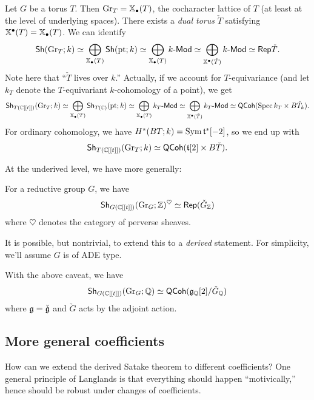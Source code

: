 \documentclass{article}
\begin{document}
\begin{ex}
	Let $G$ be a torus $T$.
	Then $\operatorname{Gr}_T = \mathbb{X}_\bullet(T)$, the cocharacter lattice of $T$ (at least at the level of underlying spaces).
	There exists a \emph{dual torus} $\check{T}$ satisfying $\mathbb{X}^\bullet(T) = \mathbb{X}_\bullet(T)$.
	We can identify
	\[
		\mathsf{Sh}(\operatorname{Gr}_T; k) \simeq \bigoplus_{\mathbb{X}_\bullet(T)} \mathsf{Sh}(\operatorname{pt}; k) \simeq \bigoplus_{\mathbb{X}_\bullet(T)} k\text{-}\mathsf{Mod} \simeq \bigoplus_{\mathbb{X}^\bullet(\check{T})} k\text{-}\mathsf{Mod} \simeq \mathsf{Rep} \check{T}.
	\]
	Note here that ``$\check{T}$ lives over $k$.''
	Actually, if we account for $T$-equivariance (and let $k_T$ denote the $T$-equivariant $k$-cohomology of a point), we get
	\[
		\mathsf{Sh}_{T(\mathbb{C}[[t]])}(\operatorname{Gr}_T; k) \simeq \bigoplus_{\mathbb{X}_\bullet(T)} \mathsf{Sh}_{T(\mathbb{C})}(\operatorname{pt}; k) \simeq \bigoplus_{\mathbb{X}_\bullet(T)} k_T\text{-}\mathsf{Mod} \simeq \bigoplus_{\mathbb{X}^\bullet(\check{T})} k_T\text{-}\mathsf{Mod} \simeq \mathsf{QCoh}(\operatorname{Spec} k_T \times B \check{T}_k).
	\]
	For ordinary cohomology, we have $H^*(BT; k) = \operatorname{Sym} \mathfrak{t}^*[-2]$, so we end up with 
	\[
		\mathsf{Sh}_{T(\mathbb{C}[[t]])}(\operatorname{Gr}_T; k) \simeq \mathsf{QCoh}(\mathfrak{t}[2] \times B\check{T}).
	\]
\end{ex}

At the underived level, we have more generally:

\begin{thm}
	For a reductive group $G$, we have
	\[
		\mathsf{Sh}_{G(\mathbb{C}[[t]])}(\operatorname{Gr}_G; \mathbb{Z})^\heartsuit \simeq \mathsf{Rep}(\check{G}_{\mathbb{Z}})
	\]
	where $\heartsuit$ denotes the category of perverse sheaves.
\end{thm}

It is possible, but nontrivial, to extend this to a \emph{derived} statement.
For simplicity, we'll assume $G$ is of ADE type.

\begin{thm}
	With the above caveat, we have
	\[
		\mathsf{Sh}_{G(\mathbb{C}[[t]])}(\operatorname{Gr}_G; \mathbb{Q}) \simeq \mathsf{QCoh}(\mathfrak{g}_{\mathbb{Q}}[2] / \check{G}_{\mathbb{Q}})
	\]
	where $\mathfrak{g} = \check{\mathfrak{g}}$ and $\check{G}$ acts by the adjoint action.
\end{thm}

\subsection{More general coefficients}

How can we extend the derived Satake theorem to different coefficients?
One general principle of Langlands is that everything should happen ``motivically,'' hence should be robust under changes of coefficients.
\end{document}
